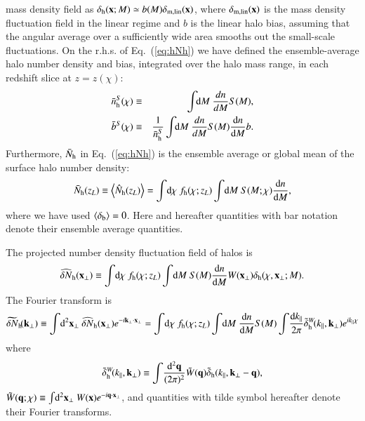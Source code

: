 \documentclass[onecolumn,notitlepage,showpacs,amsmath,amssymb,prd,floatfix]{revtex4-1}
\def\ave#1{\left\langle #1 \right\rangle}
\newcommand{\bx}{{\bf x}}
\newcommand{\bk}{{\bf k}}
\newcommand{\bq}{{\bf q}}
\newcommand{\tW}{\tilde{W}}
\newcommand{\dr}{\mathrm{d}}
\newcommand{\deltab}{\delta_{\rm b}}
\newcommand{\deltaml}{\delta_{\mathrm{m,lin}}}
\newcommand{\deltah}{\delta_{\mathrm{h}}}
\newcommand{\bh}{\mathrm{h}}
\newcommand{\bnh}{\frac{\dr n}{\dr M}}
\newcommand{\bnhs}{\bar{n}_{\rm h}^S}
\newcommand{\hNh}{\hat{N}_{\rm h}}
\newcommand{\hdNh}{\widehat{\delta N}_{\rm h}}
\newcommand{\bNh}{\bar{N}_{\rm h}}
\newcommand{\tdsigmah}{\widetilde{\delta N}_{\rm h}\!}
\newcommand{\tdeltah}{\tilde{\delta}_{\rm h}}
\begin{document}
mass density field as $\deltah(\bx; M)\simeq b(M)\deltaml(\bx)$, where
$\deltaml(\bx)$ is the mass density fluctuation field in the linear
regime and $b$ is the linear halo bias, assuming that the angular
average over a sufficiently wide area smooths out the small-scale
fluctuations. On the r.h.s. of Eq.~(\ref{eq:hNh}) we have defined the
ensemble-average halo number density and bias, integrated over the halo
mass range, in each redshift slice at $z=z(\chi)$:
%
\begin{eqnarray}
 \bnhs(\chi) &\equiv & \int\!\!\dr M~ \frac{dn}{dM}S(M), \nonumber\\
 \bar{b}^S(\chi)&\equiv & \frac{1}{\bnhs}\int\!\!\dr M~
  \frac{dn}{dM}S(M)\bnh b.
\label{eq:aveb}
\end{eqnarray}
%
Furthermore, $\bNh$ in Eq.~(\ref{eq:hNh}) is the ensemble average or
global mean of the surface halo number density:
%
\begin{equation}
 \bNh(z_L)\equiv 
 \ave{\hNh(z_L)}=\int\!\dr\chi~f_\bh(\chi;z_L)\int\!\dr
 M~S(M;\chi)\frac{\dr n}{\dr M}, 
\end{equation}
%
where we have used $\ave{\deltab}=0$.  Here and hereafter quantities
with bar notation denote their ensemble average quantities.




The projected number density fluctuation field of halos is
%
\begin{equation}
 \hdNh(\bx_\perp)\equiv
    \int\!\dr\chi~f_\bh(\chi;z_L)\int\!\dr M~S(M)\bnh
  W(\bx_\perp)\deltah(\chi,\bx_\perp; M).
\end{equation}
%
The Fourier transform is
%
\begin{equation}
 \tdsigmah(\bk_\perp)\equiv \int\!\dr^2\bx_\perp~ \hdNh(\bx_\perp)e^{-i\bk_\perp\cdot\bx_\perp}
  =\int\!\dr\chi~f_\bh(\chi;z_L)\int\!\dr M~\bnh S(M)\int\!\frac{\dr k_\parallel}{2\pi}
  \tdeltah^W\!(k_\parallel,\bk_\perp)e^{ik_\parallel\chi}
\end{equation}
%
where 
%
\begin{equation}
  \tdeltah^W\!(k_\parallel,\bk_\perp)\equiv 
  \int\!\frac{\dr^2\bq}{(2\pi)^2}\tW(\bq)
  \tdeltah(k_\parallel,\bk_\perp-\bq),
\end{equation}
%
$\tW(\bq;\chi)\equiv
\int\!\dr^2\bx_\perp~W(\bx)e^{-i\bq\cdot\bx_\perp}$, and
quantities with tilde symbol hereafter denote their Fourier
transforms.
\end{document}
